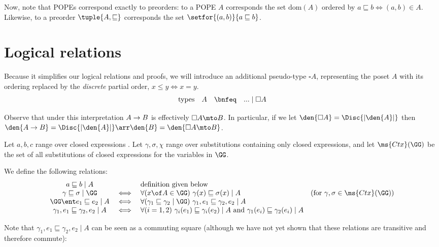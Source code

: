 \documentclass{article}
\renewcommand{\land}{~\text{and}~}
\newcommand{\ale}{\sqsubseteq}
\newcommand{\dom}[1]{\text{dom}(#1)}
\newcommand{\disc}[1]{\square{#1}}
\newcommand{\lr}[2]{#2\mathrel{|}#1}
\newcommand{\lrcx}[3]{#1 \ent \lr{#2}{#3}}
\newcommand{\commsq}[5]{\lr{#1}{{#2}, {#4} \ale {#3}, {#5}}}
\begin{document}
Now, note that POPEs correspond exactly to preorders: to a POPE $A$ corresponds
the set $\dom{A}$ ordered by $a \ale b \iff (a,b) \in A$. Likewise, to a
preorder $\tuple{A,\ale}$ corresponds the set $\setfor{(a,b)}{a \ale b}$.


\section{Logical relations}

Because it simplifies our logical relations and proofs, we will introduce an
additional pseudo-type $\disc{A}$, representing the poset $A$ with its ordering
replaced by the \emph{discrete} partial order, $x \le y \iff x = y$.
\[\begin{array}{rccl}
  \text{types} &
  A &\bnfeq& ... \pipe \disc{A}
\end{array}\]

Observe that under this interpretation $A \to B$ is effectively $\disc{A} \mto
B$. In particular, if we let $\den{\disc{A}} = \Disc{|\den{A}|}$ then $\den{A
  \uto B} = \Disc{|\den{A}|} \arr \den{B} = \den{\disc{A} \mto B}$.

Let $a,b,c$ range over closed expressions%
. Let $\gamma, \sigma, \chi$ range over substitutions containing only closed
expressions, and let $\ms{Ctx}(\GG)$ be the set of all substitutions of closed
expressions for the variables in $\GG$.

We define the following relations:
\[\begin{array}{ccll}
    \lr{A}{a \ale b}  && \text{definition given below}\\
    \lr{\GG}{\gamma \ale \sigma}
    &\iff& \forall(x \of A \in \GG)\ \lr{A}{\gamma(x) \ale \sigma(x)}
    & (\text{for}~\gamma,\sigma \in \ms{Ctx}(\GG))\\
    \lrcx{\GG}{A}{e_1 \ale e_2}
    &\iff& \forall(\lr{\GG}{\gamma_1 \ale \gamma_2})\
    \commsq{A}{\gamma_1}{\gamma_2}{e_1}{e_2}\\
    \commsq{A}{\gamma_1}{\gamma_2}{e_1}{e_2}
    &\iff& \forall(i = 1,2)\ \lr{A}{\gamma_i(e_1) \ale \gamma_i(e_2)}
    \land \lr{A}{\gamma_1(e_i) \ale \gamma_2(e_i)}
\end{array}\]

Note that $\commsq{A}{\gamma_1}{\gamma_2}{e_1}{e_2}$ can be seen as a commuting
square (although we have not yet shown that these relations are transitive and
therefore commute):
\begin{center}
  {\large
  }
\end{center}
\end{document}
